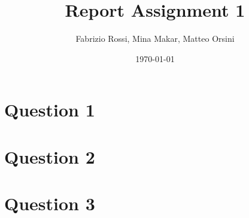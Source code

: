\documentclass{article}
\title{Report Assignment 1}
\author{Fabrizio Rossi, Mina Makar, Matteo Orsini}
\date{\today}
\begin{document}
\begin{titlepage}
\clearpage\maketitle
\thispagestyle{empty}
\end{titlepage}

\section*{Question 1}
\Blindtext

\section*{Question 2}
\Blindtext

\section*{Question 3}
\Blindtext
\end{document}

